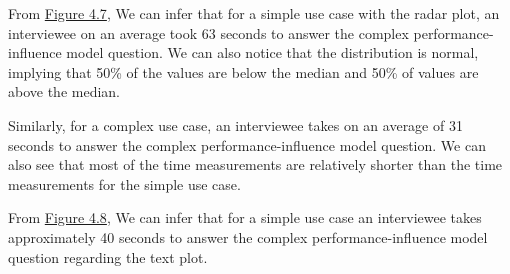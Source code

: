 \begin{description}[leftmargin=0pt]
\begin{minipage}[b]{0.5\textwidth}
\end{minipage}
\begin{center}
\label{scalabilityRatio}
\end{center}

\begin{description}[leftmargin=0pt]
\item[Radar Plot: ]From \hyperref[scalabilityRadar]{Figure 4.7}, We can infer that
for a simple use case with the radar plot, an interviewee on an average took 63 seconds to answer the complex performance-influence model question. We can also notice that the distribution is normal, implying that 50\% of the values are below the median and 50\% of values are above the median. 

Similarly, for a complex use case, an interviewee takes on an average of 31 seconds to answer the complex performance-influence model question. We can also see that most of the time measurements are relatively shorter than the time measurements for the simple use case.

\item[Text Plot: ]From \hyperref[scalabilityText]{Figure 4.8}, We can infer that for a simple use case an interviewee takes approximately 40 seconds to answer the complex performance-influence model question regarding the text plot. 


\end{description}
\end{description}

